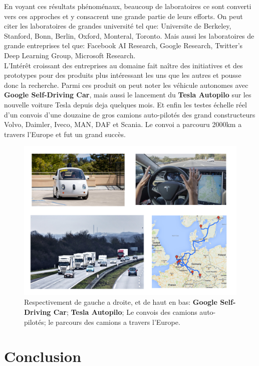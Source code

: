 En voyant ces résultats phénoménaux, beaucoup de laboratoires ce sont converti vers ces approches et y consacrent une grande partie de leurs efforts. On peut citer les laboratoires de grandes université tel que: Universite de Berkeley, Stanford, Bonn, Berlin, Oxford, Monteral, Toronto. Mais aussi les laboratoires de grande entreprises tel que: Facebook AI Research, Google Research, Twitter’s Deep Learning Group, Microsoft Research.\\

L’Intérêt croissant des entreprises au domaine fait naître des initiatives et des prototypes pour des produits plus intéressant les uns que les autres et pousse donc la recherche. Parmi ces produit on peut noter les véhicule autonomes avec \textbf{Google Self-Driving Car}, mais aussi le lancement du \textbf{Tesla Autopilo} sur les nouvelle voiture Tesla depuis deja quelques mois. Et enfin les testes échelle réel d'un convois d'une douzaine de gros camions auto-pilotés des grand constructeurs Volvo, Daimler, Iveco, MAN, DAF et Scania. Le convoi a parcouru 2000km a travers l’Europe et fut un grand succès.

\begin{figure}[H]
	\centering
		\includegraphics[width=5in]{Figures/selfDriving.png}
	\caption[An Electron]{Respectivement de gauche a droite, et de haut en bas: \textbf{Google Self-Driving Car}; \textbf{Tesla Autopilo}; Le convois des camions auto-pilotés; le parcours des camions a travers l'Europe.}
	\label{fig:Electron}
\end{figure}


\section{Conclusion}

